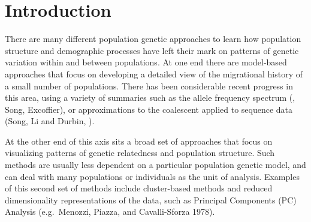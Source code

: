 \documentclass[12pt]{article}
\begin{document}
\newpage
\section*{Introduction}
There are many different population genetic approaches to learn how population structure and demographic processes have left their mark on patterns of genetic variation within and between populations.  At one end there are model-based approaches that focus on developing a detailed view of the migrational history of a small number of populations. There has been considerable recent progress in this area, using a variety of summaries such as the allele frequency spectrum (\citep{dadi}, Song, Excoffier), or approximations to the coalescent applied to sequence data (Song, Li and Durbin,  ).  

At the other end of this axis sits a broad set of approaches that focus on visualizing patterns of genetic relatedness and population structure. Such methods are usually less dependent on a particular population genetic model, and can deal with many populations or individuals as the unit of analysis. Examples of this second set of methods include cluster-based methods \citep{STRUCTURE, ADMIXTURE, FINESTRUCTURE} and reduced dimensionality representations of the data, such as Principal Components (PC) Analysis (e.g.\ Menozzi, Piazza, and Cavalli-Sforza 1978).  
\end{document}
